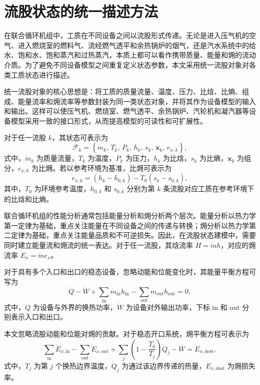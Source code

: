 \section{流股状态的统一描述方法}

在联合循环机组中，工质在不同设备之间以流股形式传递。无论是进入压气机的空气、进入燃烧室的燃料气、流经燃气透平和余热锅炉的烟气，还是汽水系统中的给水、饱和水、饱和蒸汽和过热蒸汽，本质上都可以看作携带质量、能量和㶲的流动介质。为了避免不同设备模型之间重复定义状态参数，本文采用统一流股对象对各类工质状态进行描述。

统一流股对象的核心思想是：将工质的质量流量、温度、压力、比焓、比熵、组成、能量流率和㶲流率等参数封装为同一类状态对象，并将其作为设备模型的输入和输出。这样可以使压气机、燃烧室、燃气透平、余热锅炉、汽轮机和凝汽器等设备模型采用一致的接口形式，从而提高模型的可读性和可扩展性。

对于任一流股 $k$，其状态可表示为
\begin{equation}\label{eq:stream-state}
\mathcal{F}_k
=
\left\{
\dot{m}_k,\,
T_k,\,
P_k,\,
h_k,\,
s_k,\,
\boldsymbol{x}_k,\,
e_{x,k}
\right\},
\end{equation}
式中，$\dot{m}_k$ 为质量流量，$T_k$ 为温度，$P_k$ 为压力，$h_k$ 为比焓，$s_k$ 为比熵，$\boldsymbol{x}_k$ 为组分，$e_{x,k}$ 为比㶲。若以参考环境为基准，比㶲可表示为
\begin{equation}\label{eq:specific-exergy}
e_{x,k}
=
\left(h_k-h_{0,k}\right)
-
T_0\left(s_k-s_{0,k}\right),
\end{equation}
其中，$T_0$ 为环境参考温度，$h_{0,k}$ 和 $s_{0,k}$ 分别为第 $k$ 条流股对应工质在参考环境下的比焓和比熵。

联合循环机组的性能分析通常包括能量分析和㶲分析两个层次。能量分析以热力学第一定律为基础，重点关注能量在不同设备之间的传递与转换；㶲分析以热力学第二定律为基础，重点关注能量品质和不可逆损失。因此，在流股状态建模中，需要同时建立能量流和㶲流的统一表达。对于任一流股，其焓流率 $\dot{H}=\dot{m}h$，对应的㶲流率 $\dot{E}_x=\dot{m}e_x$。

对于具有多个入口和出口的稳态设备，忽略动能和位能变化时，其能量平衡方程可写为
\begin{equation}\label{eq:energy-balance}
\dot{Q}
-
\dot{W}
+
\sum_{\mathrm{in}}\dot{m}_{\mathrm{in}}h_{\mathrm{in}}
-
\sum_{\mathrm{out}}\dot{m}_{\mathrm{out}}h_{\mathrm{out}}
=
0,
\end{equation}
式中，$\dot{Q}$ 为设备与外界的换热功率，$\dot{W}$ 为设备对外输出功率，下标 $\mathrm{in}$ 和 $\mathrm{out}$ 分别表示入口和出口。

本文忽略流股动能和位能对㶲的贡献。对于稳态开口系统，㶲平衡方程可表示为
\begin{equation}\label{eq:exergy-balance}
\sum_{\mathrm{in}}\dot{E}_{x,\mathrm{in}}
-
\sum_{\mathrm{out}}\dot{E}_{x,\mathrm{out}}
+
\sum_j
\left(
1-\frac{T_0}{T_j}
\right)
\dot{Q}_j
-
\dot{W}
=
\dot{E}_{x,\mathrm{dest}},
\end{equation}
式中，$T_j$ 为第 $j$ 个换热边界温度，$\dot{Q}_j$ 为通过该边界传递的热量，$\dot{E}_{x,\mathrm{dest}}$ 为㶲损失率。

